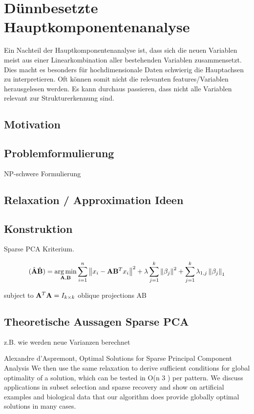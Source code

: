 \chapter{Dünnbesetzte Hauptkomponentenanalyse}

\label{sparse_pca}

Ein Nachteil der Hauptkomponentenanalyse ist, dass sich die neuen Variablen meist aus einer Linearkombination aller bestehenden Variablen zusammensetzt. Dies macht es besonders für hochdimensionale Daten schwierig die Hauptachsen zu interpretieren. Oft können somit nicht die relevanten features/Variablen herausgelesen werden. Es kann durchaus passieren, dass nicht alle Variablen relevant zur Strukturerkennung sind. 

\section{Motivation}

\section{Problemformulierung}
NP-schwere Formulierung

\section{Relaxation / Approximation Ideen}

\section{Konstruktion}

Sparse PCA Kriterium.

$$(\hat{\mathbf{A}}\hat{\mathbf{B}}) = \operatorname*{arg\,min}_{\mathbf{A}, \mathbf{B}} \sum_{i=1}^{n} \left\lVert x_i - \mathbf{A}\mathbf{B}^Tx_i \right\rVert^2 + \lambda \sum_{j=1}^{k}\left\lVert \beta_j \right\rVert^2 + \sum_{j=1}^k \lambda_{1,j} \left\lVert \beta_j \right\rVert_1$$

subject to $\mathbf{A}^T\mathbf{A} = I_{k \times k}$
oblique projections AB

\section{Theoretische Aussagen Sparse PCA}
z.B. wie werden neue Varianzen berechnet

Alexandre d’Aspremont, Optimal Solutions for Sparse Principal Component Analysis
We then use the same relaxation to derive sufficient conditions for global optimality of a
solution, which can be tested in O(n
3
) per pattern. We discuss applications in subset selection and
sparse recovery and show on artificial examples and biological data that our algorithm does provide
globally optimal solutions in many cases.
